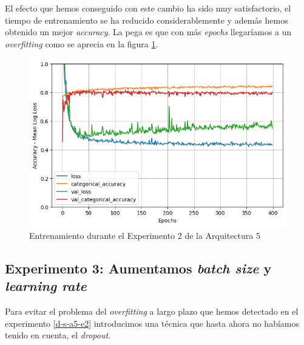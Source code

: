 \documentclass{article}
\begin{document}
		    El efecto que hemos conseguido con este cambio ha sido muy satisfactorio, el tiempo de entrenamiento se ha reducido considerablemente y adem\'as hemos obtenido un mejor \textit{accuracy}. La pega es que con m\'as \textit{epochs} llegar\'iamos a un \textit{overfitting} como se aprecia en la figura \ref{d-tr-a5-e2}.
		    
			\begin{figure}[!h]
				\begin{center}
					\includegraphics[scale=0.5]{d-tr-a5-e2.png}		
					\caption{Entrenamiento durante el Experimento 2 de la Arquitectura 5}	
					\label{d-tr-a5-e2}
				\end{center}
			\end{figure}
		
		\subsection{Experimento 3: Aumentamos \textit{batch size} y \textit{learning rate}}
		\label{d-s-a5-e3}
			Para evitar el problema del \textit{overfitting} a largo plazo que hemos detectado en el experimento \ref{d-s-a5-e2} introducimos una t\'ecnica que hasta ahora no hab\'iamos tenido en cuenta, el \textit{dropout}.
		
\end{document}
